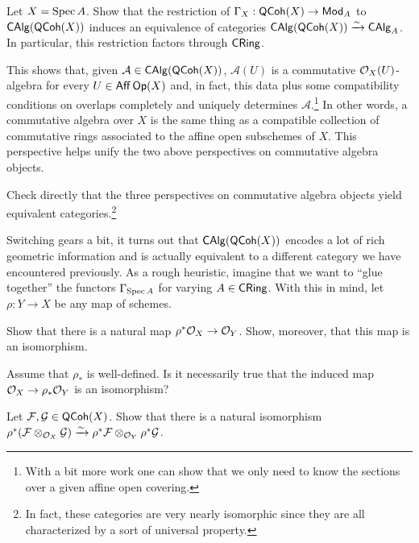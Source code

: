 \documentclass[11pt]{article}
\renewcommand{\AA}{\mathcal{A}}
\renewcommand{\F}{\mathcal{F}}
\newcommand{\G}{\mathcal{G}}
\begin{document}
\begin{exercise}
Let $X=\operatorname{Spec} A$. Show that the restriction of $\Gamma_X: \operatorname{\mathsf{QCoh}}(X)\to\operatorname{\mathsf{Mod}}_A$ to $\operatorname{\mathsf{CAlg}}(\operatorname{\mathsf{QCoh}}(X))$ induces an equivalence of categories $\operatorname{\mathsf{CAlg}}(\operatorname{\mathsf{QCoh}}(X))\xrightarrow{\sim}\operatorname{\mathsf{CAlg}}_A$. In particular, this restriction factors through $\operatorname{\mathsf{CRing}}$.
\end{exercise}

This shows that, given $\AA\in\CAlg(\QCoh(X))$, $\AA(U)$ is a commutative $\mathcal{O}_X(U)$-algebra for every $U\in\operatorname{\mathsf{Aff}}\operatorname{\mathsf{Op}}(X)$ and, in fact, this data plus some compatibility conditions on overlaps completely and uniquely determines $\AA$.\footnote{With a bit more work one can show that we only need to know the sections over a given affine open covering.} In other words, a commutative algebra over $X$ is the same thing as a compatible collection of commutative rings associated to the affine open subschemes of $X$. This perspective helps unify the two above perspectives on commutative algebra objects.

\begin{exercise}
Check directly that the three perspectives on commutative algebra objects yield equivalent categories.\footnote{In fact, these categories are very nearly isomorphic since they are all characterized by a sort of universal property.}
\end{exercise}

Switching gears a bit, it turns out that $\operatorname{\mathsf{CAlg}}(\operatorname{\mathsf{QCoh}}(X))$ encodes a lot of rich geometric information and is actually equivalent to a different category we have encountered previously. As a rough heuristic, imagine that we want to ``glue together'' the functors $\Gamma_{\operatorname{Spec} A}$ for varying $A\in\operatorname{\mathsf{CRing}}$. With this in mind, let $\rho: Y\to X$ be any map of schemes.

\begin{exercise}
\hfill
\begin{enum}{\alph}
\item Show that there is a natural map $\rho^*\mathcal{O}_X\to\mathcal{O}_Y$. Show, moreover, that this map is an isomorphism. 

\item Assume that $\rho_*$ is well-defined. Is it necessarily true that the induced map $\mathcal{O}_X\to\rho_*\mathcal{O}_Y$ is an isomorphism?

\item Let $\F,\G\in\QCoh(X)$. Show that there is a natural isomorphism $\rho^*(\F\tensor_{\O_X}\G)\xto{\sim}\rho^*\F\tensor_{\O_Y}\rho^*\G$.
\end{enum}
\end{exercise}
\end{document}
